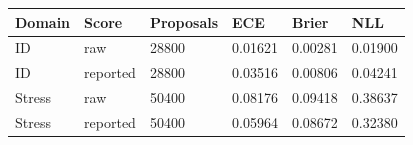 \begin{tabular}{llllll}
\toprule
Domain & Score & Proposals & ECE & Brier & NLL \\
\midrule
ID & raw & 28800 & 0.01621 & 0.00281 & 0.01900 \\
ID & reported & 28800 & 0.03516 & 0.00806 & 0.04241 \\
Stress & raw & 50400 & 0.08176 & 0.09418 & 0.38637 \\
Stress & reported & 50400 & 0.05964 & 0.08672 & 0.32380 \\
\bottomrule
\end{tabular}
